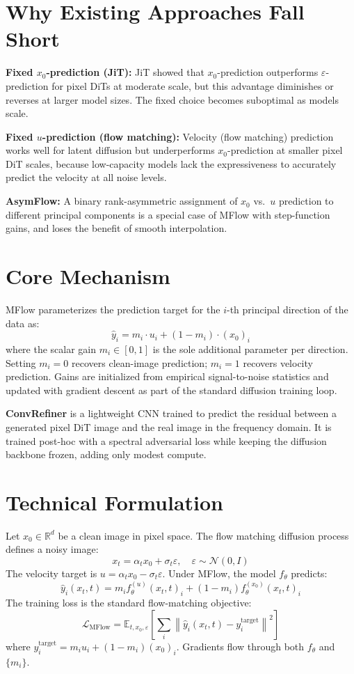 \documentclass[10pt,twocolumn]{article}
\begin{document}
\section{Why Existing Approaches Fall Short}

\textbf{Fixed $x_0$-prediction (JiT):}
JiT showed that $x_0$-prediction outperforms $\varepsilon$-prediction
for pixel DiTs at moderate scale, but this advantage diminishes or
reverses at larger model sizes. The fixed choice becomes suboptimal
as models scale.

\textbf{Fixed $u$-prediction (flow matching):}
Velocity (flow matching) prediction works well for latent diffusion
but underperforms $x_0$-prediction at smaller pixel DiT scales,
because low-capacity models lack the expressiveness to accurately
predict the velocity at all noise levels.

\textbf{AsymFlow:}
A binary rank-asymmetric assignment of $x_0$ vs.\ $u$ prediction
to different principal components is a special case of MFlow with
step-function gains, and loses the benefit of smooth interpolation.

\section{Core Mechanism}

MFlow parameterizes the prediction target for the $i$-th principal
direction of the data as:
\[
\hat{y}_i = m_i \cdot u_i + (1 - m_i) \cdot (x_0)_i
\]
where the scalar gain $m_i \in [0, 1]$ is the sole additional
parameter per direction. Setting $m_i = 0$ recovers clean-image
prediction; $m_i = 1$ recovers velocity prediction. Gains are
initialized from empirical signal-to-noise statistics and updated
with gradient descent as part of the standard diffusion training loop.

\textbf{ConvRefiner} is a lightweight CNN trained to predict the
residual between a generated pixel DiT image and the real image in
the frequency domain. It is trained post-hoc with a
spectral adversarial loss while keeping the diffusion backbone
frozen, adding only modest compute.

\section{Technical Formulation}

Let $x_0 \in \mathbb{R}^d$ be a clean image in pixel space.
The flow matching diffusion process defines a noisy image:
\[
x_t = \alpha_t x_0 + \sigma_t \varepsilon, \quad \varepsilon \sim \mathcal{N}(0, I)
\]
The velocity target is $u = \alpha_t x_0 - \sigma_t \varepsilon$.
Under MFlow, the model $f_\theta$ predicts:
\[
\hat{y}_i(x_t, t) = m_i f_\theta^{(u)}(x_t, t)_i + (1 - m_i) f_\theta^{(x_0)}(x_t, t)_i
\]
The training loss is the standard flow-matching objective:
\[
\mathcal{L}_\mathrm{MFlow} = \mathbb{E}_{t, x_0, \varepsilon}
  \left[\sum_i \left\|\hat{y}_i(x_t, t) - y_i^\mathrm{target}\right\|^2\right]
\]
where $y_i^\mathrm{target} = m_i u_i + (1 - m_i)(x_0)_i$.
Gradients flow through both $f_\theta$ and $\{m_i\}$.
\end{document}
